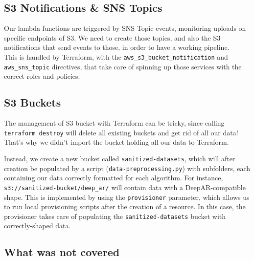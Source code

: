 \subsection{S3 Notifications \& SNS Topics}

Our lambda functions are triggered by SNS Topic events, monitoring uploads on specific endpoints of S3. We need to create those topics, and also the S3 notifications that send events to those, in order to have a working pipeline. \\
This is handled by Terraform, with the \lstinline{aws_s3_bucket_notification} and \lstinline{aws_sns_topic} directives, that take care of spinning up those services with the correct roles and policies.

\subsection{S3 Buckets}
The management of S3 bucket with Terraform can be tricky, since calling \lstinline{terraform destroy} will delete all existing buckets and get rid of all our data! That's why we didn't import the bucket holding all our data to Terraform.

Instead, we create a new bucket called \lstinline{sanitized-datasets}, which will after creation be populated by a script (\lstinline{data-preprocessing.py}) with subfolders, each containing our data correctly formatted for each algorithm. For instance, \lstinline{s3://sanitized-bucket/deep_ar/} will contain data with a DeepAR-compatible shape. This is implemented by using the \lstinline{provisioner} parameter, which allows us to run local provisioning scripts after the creation of a resource. In this case, the provisioner takes care of populating the \lstinline{sanitized-datasets} bucket with correctly-shaped data.

\subsection{What was not covered}

